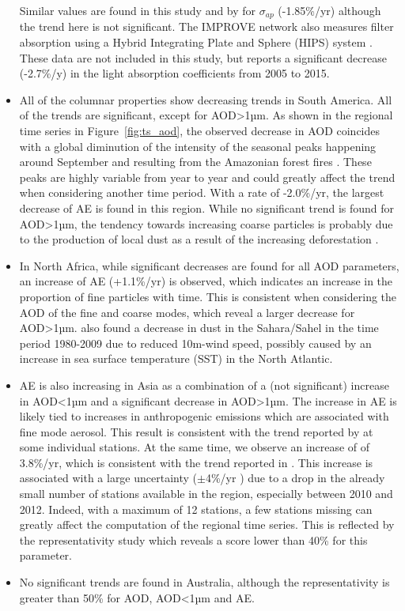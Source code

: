 \documentclass[acp, manuscript]{copernicus}
\begin{document}
\begin{itemize}
 Similar values are found in this study and by \cite{collaudcoen-2019} for $\sigma_{ap}$ (-1.85\%/yr) although the trend here is not significant. The IMPROVE network also measures filter absorption using a Hybrid Integrating Plate and Sphere (HIPS) system \citep{Warren2016}. These data are not included in this study, but \cite{Warren2016} reports a significant decrease (-2.7\%/y) in the light absorption coefficients from 2005 to 2015.
 \item All of the columnar properties show decreasing trends in South America. All of the trends are significant, except for AOD>1µm. As shown in the regional time series in Figure~\ref{fig:ts_aod}, the observed decrease in AOD coincides with a global diminution of the intensity of the seasonal peaks happening around September and resulting from the Amazonian forest fires \citep{aragao201821st}. These peaks are highly variable from year to year and could greatly affect the trend when considering another time period. With a rate of -2.0\%/yr, the largest decrease of AE is found in this region. While no significant trend is found for AOD>1µm, the tendency towards increasing coarse particles is probably due to the production of local dust as a result of the increasing deforestation \citep{werth2002local,betts2008effects}.
 \item In North Africa, while significant decreases are found for all AOD parameters, an increase of AE (+1.1\%/yr) is observed, which indicates an increase in the proportion of fine particles with time. This is consistent when considering the AOD of the fine and coarse modes, which reveal a larger decrease for AOD>1µm. \cite{chin2014multi} also found a decrease in dust in the Sahara/Sahel in the time period 1980-2009 due to reduced 10m-wind speed, possibly caused by an increase in sea surface temperature (SST) in the North Atlantic.
 \item AE is also increasing in Asia as a combination of a (not significant) increase in AOD<1µm and a significant decrease in AOD>1µm. The increase in AE is likely tied to increases in anthropogenic emissions which are associated with fine mode aerosol. This result is consistent with the trend reported by \cite{yoon2012trend} at some individual stations. At the same time, we observe an increase of  of 3.8\%/yr, which is consistent with the trend reported in \cite{aas2019global}. This increase is associated with a large uncertainty ($\pm$4\%/yr ) due to a drop in the already small number of stations available in the region, especially between 2010 and 2012. Indeed, with a maximum of 12 stations, a few stations missing can greatly affect the computation of the regional time series. This is reflected by the representativity study which reveals a score lower than 40\% for this parameter. 
 \item No significant trends are found in Australia, although the representativity is greater than 50\% for AOD, AOD<1µm and AE.

\end{itemize}
\end{document}
